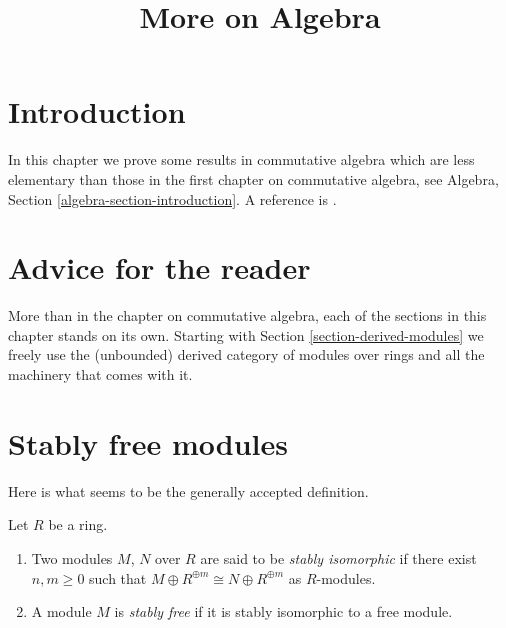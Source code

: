 

%


\title{More on Algebra}


\maketitle

\label{section-phantom}

\tableofcontents



\section{Introduction}
\label{section-introduction}

\noindent
In this chapter we prove some results in commutative algebra which
are less elementary than those in the first chapter on commutative
algebra, see
Algebra, Section \ref{algebra-section-introduction}.
A reference is \cite{MatCA}.






\section{Advice for the reader}
\label{section-advice}

\noindent
More than in the chapter on commutative algebra, each of the sections in
this chapter stands on its own. Starting with
Section \ref{section-derived-modules}
we freely use the (unbounded) derived category of modules over rings and all
the machinery that comes with it.




\section{Stably free modules}
\label{section-stably-free}

\noindent
Here is what seems to be the generally accepted definition.

\begin{definition}
\label{definition-stably-free}
Let $R$ be a ring. 
\begin{enumerate}
\item Two modules $M$, $N$ over $R$ are said to be
{\it stably isomorphic} if there exist $n, m \geq 0$ such
that $M \oplus R^{\oplus m} \cong N \oplus R^{\oplus m}$
as $R$-modules.
\item A module $M$ is {\it stably free} if it is stably isomorphic
to a free module.
\end{enumerate}
\end{definition}

